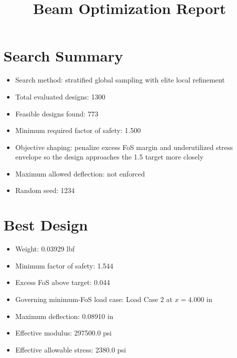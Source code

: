 \documentclass[11pt]{article}
\title{Beam Optimization Report}
\date{}
\begin{document}
\maketitle

\section*{Search Summary}
\begin{itemize}
\item Search method: stratified global sampling with elite local refinement
\item Total evaluated designs: 1300
\item Feasible designs found: 773
\item Minimum required factor of safety: 1.500
\item Objective shaping: penalize excess FoS margin and underutilized stress envelope so the design approaches the 1.5 target more closely
\item Maximum allowed deflection: not enforced
\item Random seed: 1234
\end{itemize}

\section*{Best Design}
\begin{itemize}
\item Weight: 0.03929 lbf
\item Minimum factor of safety: 1.544
\item Excess FoS above target: 0.044
\item Governing minimum-FoS load case: Load Case 2 at $x=4.000$ in
\item Maximum deflection: 0.08910 in
\item Effective modulus: 297500.0 psi
\item Effective allowable stress: 2380.0 psi
\end{itemize}
\end{document}
